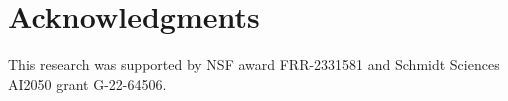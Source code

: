 \section*{Acknowledgments}
This research was supported by
NSF award FRR-2331581
and
Schmidt Sciences AI2050 grant G-22-64506.

